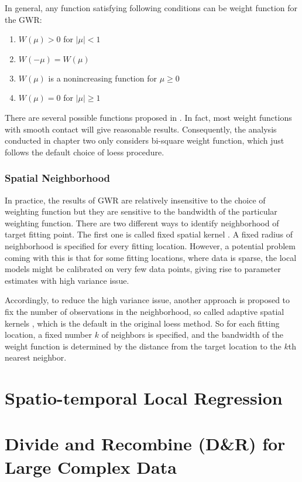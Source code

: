 In general, any function satisfying following conditions can be weight function
for the GWR:
\begin{enumerate}
\item $W(\mu) > 0$ for $|\mu| < 1$
\item $W(-\mu) = W(\mu)$
\item $W(\mu)$ is a nonincreasing function for $\mu \ge 0$
\item $W(\mu) = 0$ for $|\mu| \ge 1$
\end{enumerate}
There are several possible functions proposed in \cite{fotheringhamgeographically}.
In fact, most weight functions with smooth contact will give reasonable results.
Consequently, the analysis conducted in chapter two only considers bi-square
weight function, which just follows the default choice of loess procedure.

\subsubsection{Spatial Neighborhood}

In practice, the results of GWR are relatively insensitive to the choice of 
weighting function but they are sensitive to the bandwidth of the particular 
weighting function. There are two different ways to identify neighborhood of 
target fitting point. The first one is called fixed spatial kernel 
\cite{fotheringhamgeographically}. A fixed radius of neighborhood is specified
for every fitting location. 
However, a potential problem coming with this is that for some fitting locations,
where data is sparse, the local models might be calibrated on very few data points, 
giving rise to parameter estimates with high variance issue. 

Accordingly, to reduce the high variance issue, another approach is proposed to 
fix the number of observations in the neighborhood, so called adaptive spatial
kernels \cite{fotheringhamgeographically}, which is the default in the original 
loess method. So for each fitting location, a fixed number $k$ of neighbors is 
specified, and the bandwidth of the weight function is determined by the distance
from the target location to the $k$th nearest neighbor. 

\section{Spatio-temporal Local Regression}

\section{Divide and Recombine (D\&R) for Large Complex Data}

